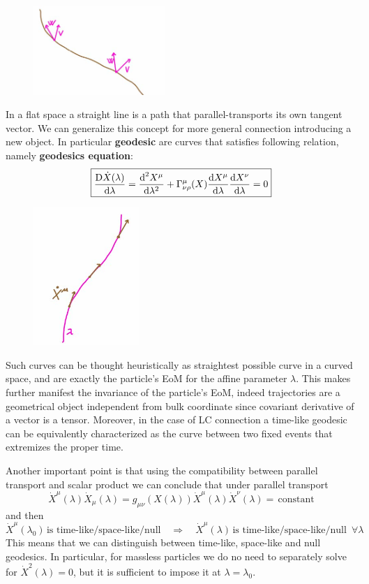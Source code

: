 \documentclass[../main/main.tex]{subfiles}
\begin{document}
\begin{figure}[H]
\centering
\includegraphics[width=5cm]{../img/parallel-transport-scalar-prod.jpg}
\end{figure}

In a flat space a straight line is a path that parallel-transports its own tangent vector. We can generalize this concept for more general connection introducing a new object. In particular \textbf{geodesic} are curves that satisfies following relation, namely \textbf{geodesics equation}:
\begin{equation}\label{eqn:geodesic-equation}\boxed{
\frac{\text{D}\dot X(\lambda)}{\textup{d}\lambda}=\frac{\textup{d}^2 X^\mu}{\textup{d}\lambda^2}+{\Gamma}^{\mu}_{\nu \rho}(X)\frac{\textup{d} X^\mu}{\textup{d} \lambda}\frac{\textup{d} X^\nu}{\textup{d} \lambda}=0
}\end{equation}

\begin{figure}[H]
\centering
\includegraphics[width=4cm]{../img/geodesic.jpg}
\end{figure}

\noindent
Such curves can be thought heuristically as straightest possible curve in a curved space, and are exactly the particle's EoM for the affine parameter $\lambda$. This makes further manifest the invariance of the particle's EoM, indeed trajectories are a geometrical object independent from bulk coordinate since covariant derivative of a vector is a tensor. Moreover, in the case of LC connection a time-like geodesic can be equivalently characterized  as the curve between two fixed events that extremizes the proper time. 

Another important point is that using the compatibility between parallel transport and scalar product we can conclude that under parallel transport
\[\dot X^\mu(\lambda)\dot X_\mu(\lambda)=g_{\mu\nu}(X(\lambda))\dot X^\mu(\lambda)\dot X^\nu(\lambda)=\,\text{constant}\]
and then
\[\boxed{
\dot X^\mu(\lambda_0)\,\text{is time-like/space-like/null}\quad\Rightarrow\quad\dot X^\mu(\lambda)\,\text{is time-like/space-like/null }\,\forall \lambda
}\]
This means that we can distinguish between time-like, space-like and null geodesics. In particular, for massless particles we do no need to separately solve for $\dot X^2(\lambda)=0$, but it is sufficient to impose it at $\lambda=\lambda_0$. 
\end{document}
